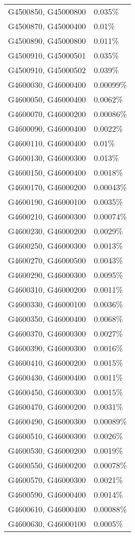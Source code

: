 \begin{longtable}[]{@{}ll@{}}
G4500850, G45000800 & 0.035\% \\
G4500870, G45000400 & 0.01\% \\
G4500890, G45000800 & 0.011\% \\
G4500910, G45000501 & 0.035\% \\
G4500910, G45000502 & 0.039\% \\
G4600030, G46000400 & 0.00099\% \\
G4600050, G46000400 & 0.0062\% \\
G4600070, G46000200 & 0.00086\% \\
G4600090, G46000400 & 0.0022\% \\
G4600110, G46000400 & 0.01\% \\
G4600130, G46000300 & 0.013\% \\
G4600150, G46000400 & 0.0018\% \\
G4600170, G46000200 & 0.00043\% \\
G4600190, G46000100 & 0.0035\% \\
G4600210, G46000300 & 0.00074\% \\
G4600230, G46000200 & 0.0029\% \\
G4600250, G46000300 & 0.0013\% \\
G4600270, G46000500 & 0.0043\% \\
G4600290, G46000300 & 0.0095\% \\
G4600310, G46000200 & 0.0011\% \\
G4600330, G46000100 & 0.0036\% \\
G4600350, G46000400 & 0.0068\% \\
G4600370, G46000300 & 0.0027\% \\
G4600390, G46000300 & 0.0016\% \\
G4600410, G46000200 & 0.0015\% \\
G4600430, G46000400 & 0.0011\% \\
G4600450, G46000300 & 0.0015\% \\
G4600470, G46000200 & 0.0031\% \\
G4600490, G46000300 & 0.00089\% \\
G4600510, G46000300 & 0.0026\% \\
G4600530, G46000200 & 0.0019\% \\
G4600550, G46000200 & 0.00078\% \\
G4600570, G46000300 & 0.0021\% \\
G4600590, G46000400 & 0.0014\% \\
G4600610, G46000400 & 0.00088\% \\
G4600630, G46000100 & 0.0005\% \\

\end{longtable}
